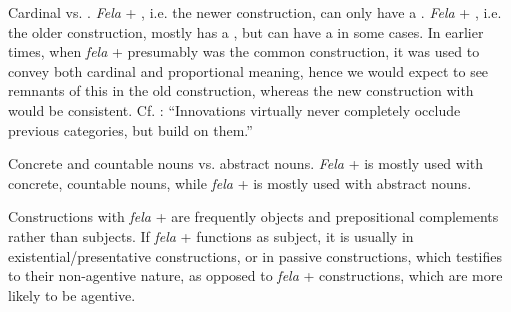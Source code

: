 \documentclass[output=paper,colorlinks,citecolor=brown]{langscibook}
\begin{document}
\begin{itemize}
\begin{sloppypar}
   \item Cardinal vs. . \textit{Fela} + , i.e. the newer construction, can only have a . \textit{Fela} + , i.e. the older construction, mostly has a , but can have a  in some cases. In earlier times, when \textit{fela} +  presumably was the common construction, it was used to convey both cardinal and proportional meaning, hence we would expect to see remnants of this  in the old  construction, whereas the new construction with  would be consistent. Cf. \citet[404]{Drinka17}: “Innovations virtually never completely occlude previous categories, but build on them.”

   \item Concrete and countable nouns vs. abstract nouns. \textit{Fela} +  is mostly used with concrete, countable nouns, while \textit{fela} +  is mostly used with abstract nouns. 
   
   \item Constructions with \textit{fela} +  are frequently objects and prepositional complements rather than subjects. If \textit{fela} +  functions as subject, it is usually in existential/presentative constructions, or in passive constructions, which testifies to their non-agentive nature, as opposed to \textit{fela} +  constructions, which are more likely to be agentive.    \end{sloppypar}
   

 \end{itemize}
\end{document}
